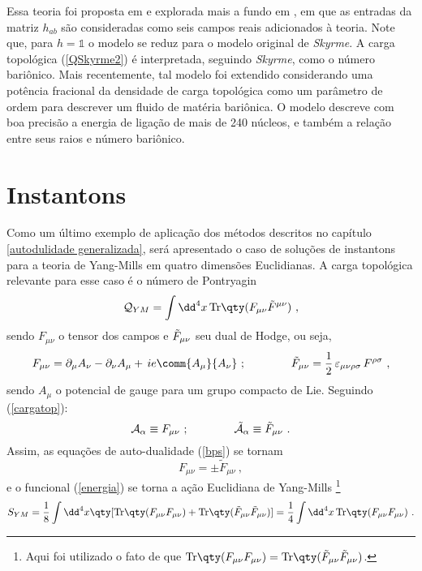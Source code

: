 Essa teoria foi proposta em \cite{lafSkyrm} e explorada mais a fundo em \cite{lafSkyrm2}, em que as entradas da matriz $h_{ab}$ são consideradas como seis campos reais adicionados à teoria. Note que, para $h = \mathbb{1}$ o modelo se reduz para o modelo original de \textit{Skyrme}. A carga topológica (\ref{QSkyrme2}) é interpretada, seguindo \textit{Skyrme}, como o número bariônico. Mais recentemente, tal modelo foi extendido considerando uma potência fracional da densidade de carga topológica como um parâmetro de ordem para descrever um fluido de matéria bariônica. O modelo descreve com boa precisão a energia de ligação de mais de 240 núcleos, e também a relação entre seus raios e número bariônico.



\section{Instantons}

Como um último exemplo de aplicação dos métodos descritos no capítulo \ref{autodulidade generalizada}, será apresentado o caso de soluções de instantons para a teoria de Yang-Mills em quatro dimensões Euclidianas. A carga topológica relevante para esse caso é o número de Pontryagin
\begin{equation}
    \mathcal{Q}_{YM} = \int \dd^4x \, \text{Tr} \qty(F_{\mu\nu} \Tilde{F}^{\mu\nu}) \ ,
\end{equation}
sendo $F_{\mu\nu}$ o tensor dos campos e $\Tilde{F}_{\mu\nu}$ seu dual de Hodge, ou seja,
\begin{equation}
    F_{\mu\nu} = \partial_\mu A_\nu - \partial_\nu A_\mu + \, ie \comm{A_\mu}{A_\nu} \ ; \qquad \qquad \Tilde{F}_{\mu\nu} = \dfrac{1}{2} \, \varepsilon_{\mu\nu\rho\sigma} \, F^{\rho\sigma} \ ,
\end{equation}
sendo $A_\mu$ o potencial de gauge para um grupo compacto de Lie. Seguindo (\ref{cargatop}):
\begin{equation}
    \mathcal{A}_\alpha \equiv F_{\mu\nu} \ ; \qquad\qquad \Tilde{\mathcal{A}}_\alpha \equiv \Tilde{F}_{\mu\nu} \ .
\end{equation}
Assim, as equações de auto-dualidade (\ref{bps}) se tornam
\begin{equation}
    F_{\mu\nu} = \pm\tilde{F}_{\mu\nu} \ ,
    \label{bpsYM}
\end{equation}
e o funcional (\ref{energia}) se torna a ação Euclidiana de Yang-Mills \footnote{Aqui foi utilizado o fato de que $\text{Tr}\qty(F_{\mu\nu}F_{\mu\nu}) = \text{Tr}\qty(\Tilde{F}_{\mu\nu}\tilde{F}_{\mu\nu})$.}
\begin{equation}
    S_{YM} = \dfrac{1}{8}\int \dd^4x \qty[\text{Tr}\qty(F_{\mu\nu}F_{\mu\nu}) + \text{Tr}\qty(\tilde{F}_{\mu\nu}\Tilde{F}_{\mu\nu})] = \dfrac{1}{4}\int \dd^4x \, \text{Tr}\qty(F_{\mu\nu}F_{\mu\nu}) \ .
\end{equation}

